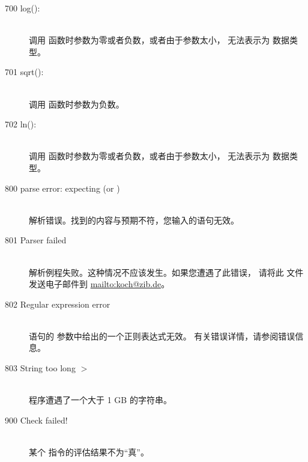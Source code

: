 \begin{description}
%
%
% 
%
\item[700 log(): ]\ \\
  调用  函数时参数为零或者负数，或者由于参数太小，
  无法表示为  数据类型。
\item[701 sqrt(): ]\ \\
  调用  函数时参数为负数。
\item[702 ln(): ]\ \\
  调用  函数时参数为零或者负数，或者由于参数太小，
  无法表示为  数据类型。
%
%
\item[800 parse error: expecting  (or )]\ \\
  解析错误。找到的内容与预期不符，您输入的语句无效。
\item[801 Parser failed]\ \\
  解析例程失败。这种情况不应该发生。如果您遭遇了此错误，
  请将此  文件发送电子邮件到 \url{mailto:koch@zib.de}。
\item[802 Regular expression error]\ \\
   语句的  参数中给出的一个正则表达式无效。
  有关错误详情，请参阅错误信息。
\item[803 String too long  $>$ ]\ \\
  程序遭遇了一个大于 1 GB 的字符串。
%
%
\item[900 Check failed!]\ \\
  某个  指令的评估结果不为“真”。
\end{description}


